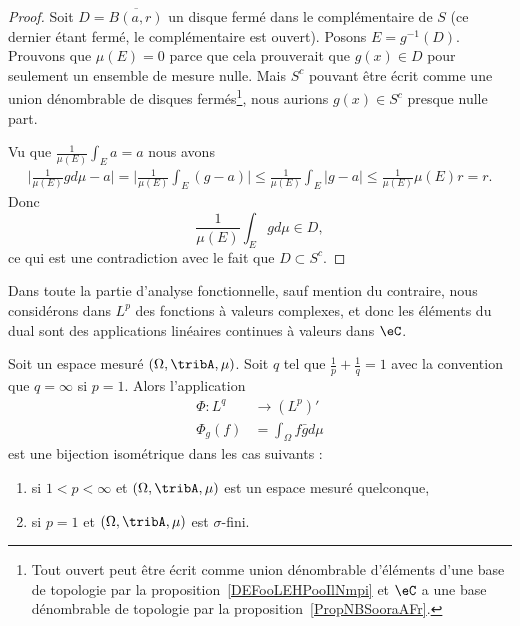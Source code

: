 \begin{proof}
    Soit \( D=\overline{ B(a,r) }\) un disque fermé dans le complémentaire de \( S\) (ce dernier étant fermé, le complémentaire est ouvert). Posons \( E=g^{-1}(D)\). Prouvons que \( \mu(E)=0\) parce que cela prouverait que \( g(x)\in D\) pour seulement un ensemble de mesure nulle. Mais \( S^c\) pouvant être écrit comme une union dénombrable de disques fermés\footnote{Tout ouvert peut être écrit comme union dénombrable d'éléments d'une base de topologie par la proposition~\ref{DEFooLEHPooIlNmpi} et $\eC$ a une base dénombrable de topologie par la proposition~\ref{PropNBSooraAFr}.}, nous aurions \( g(x)\in S^c\) presque nulle part.

    Vu que \( \frac{1}{ \mu(E) }\int_Ea=a\) nous avons
    \begin{subequations}
        \begin{align}
            \big| \frac{1}{ \mu(E) }gd\mu-a \big|=\big| \frac{1}{ \mu(E) }\int_E(g-a) \big|\leq  \frac{1}{ \mu(E) }\int_E| g-a |\leq\frac{1}{ \mu(E) }\mu(E)r=r.
        \end{align}
    \end{subequations}
    Donc
    \begin{equation}
        \frac{1}{ \mu(E) }\int_Egd\mu\in D,
    \end{equation}
    ce qui est une contradiction avec le fait que \( D\subset S^c\).
\end{proof}

Dans toute la partie d'analyse fonctionnelle, sauf mention du contraire, nous considérons dans \( L^p\) des fonctions à valeurs complexes, et donc les éléments du dual sont des applications linéaires continues à valeurs dans \( \eC\).

\begin{theorem}
                \label{ThoLPQPooPWBXuv}
    Soit un espace mesuré \( (\Omega,\tribA,\mu)\). Soit \( q\) tel que \( \frac{1}{ p }+\frac{1}{ q }=1\) avec la convention que \( q=\infty\) si \( p=1\). Alors l'application
    \begin{equation}
        \begin{aligned}
            \Phi\colon L^q&\to (L^p)' \\
            \Phi_g(f)&=\int_{\Omega}f\bar gd\mu
        \end{aligned}
    \end{equation}
    est une bijection isométrique dans les cas suivants :
    \begin{enumerate}
        \item       \label{ITEMooSQQBooWSFBmX}
            si \( 1<p<\infty\) et \( (\Omega,\tribA,\mu)\) est un espace mesuré quelconque,
        \item       \label{ITEMooCQGJooOWzjoV}
            si \( p=1\) et \( (\Omega,\tribA, \mu)\) est \( \sigma\)-fini.
    \end{enumerate}
\end{theorem}

